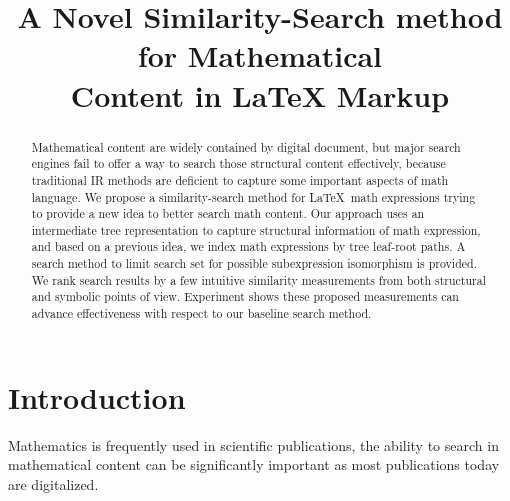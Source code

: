 \documentclass{acm_proc_article-sp}
\begin{document}
\title{A Novel Similarity-Search method for Mathematical \\ Content in {\ttlit LaTeX} Markup}


\maketitle
\begin{abstract}
Mathematical content are widely contained by digital document, but major search engines fail to offer a way to search those structural content effectively, because traditional IR methods are deficient to capture some important aspects of math language. 
We propose a similarity-search method for \LaTeX\ math expressions trying to provide a new idea to better search math content.
Our approach uses an intermediate tree representation to capture structural information of math expression, and based on a previous idea, we index math expressions by tree leaf-root paths. 
A search method to limit search set for possible subexpression isomorphism is provided.
We rank search results by a few intuitive similarity measurements from both structural and symbolic points of view. 
Experiment shows these proposed measurements can advance effectiveness with respect to our baseline search method.
\end{abstract}



\section{Introduction}
\label{intro}
Mathematics is frequently used in scientific publications, 
the ability to search in mathematical content can be significantly important as most publications today are digitalized.
\end{document}
